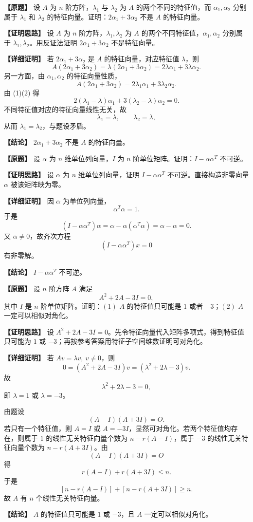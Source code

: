 \documentclass[11pt,a4paper,UTF8]{ctexart}
\begin{document}
\begin{answerbox}
\textbf{【原题】} 设 $A$ 为 $n$ 阶方阵，$\lambda_1$ 与 $\lambda_2$ 为 $A$ 的两个不同的特征值，而 $\alpha_1,\alpha_2$ 分别属于 $\lambda_1$ 和 $\lambda_2$ 的特征向量。证明：$2\alpha_1+3\alpha_2$ 不是 $A$ 的特征向量。

\textbf{【证明思路】} 设 $A$ 为 $n$ 阶方阵，$\lambda_1,\lambda_2$ 为 $A$ 的两个不同特征值，$\alpha_1,\alpha_2$ 分别属于 $\lambda_1,\lambda_2$。用反证法证明 $2\alpha_1+3\alpha_2$ 不是特征向量。

\textbf{【详细证明】} 若 $2\alpha_1+3\alpha_2$ 是 $A$ 的特征向量，对应特征值 $\lambda$，则
\[
A(2\alpha_1+3\alpha_2)=\lambda(2\alpha_1+3\alpha_2)
=2\lambda\alpha_1+3\lambda\alpha_2. \tag{1}
\]
另一方面，由 $\alpha_1,\alpha_2$ 的特征向量性质，
\[
A(2\alpha_1+3\alpha_2)=2\lambda_1\alpha_1+3\lambda_2\alpha_2. \tag{2}
\]
由 (1)(2) 得
\[
2(\lambda_1-\lambda)\alpha_1+3(\lambda_2-\lambda)\alpha_2=0.
\]
不同特征值对应的特征向量线性无关，故
\[
\lambda_1=\lambda,\qquad \lambda_2=\lambda,
\]
从而 $\lambda_1=\lambda_2$，与题设矛盾。

\textbf{【结论】} $2\alpha_1+3\alpha_2$ 不是 $A$ 的特征向量。
\end{answerbox}

\begin{answerbox}
\textbf{【原题】} 设 $\alpha$ 为 $n$ 维单位列向量，$I$ 为 $n$ 阶单位矩阵。证明：$I-\alpha\alpha^T$ 不可逆。

\textbf{【证明思路】} 设 $\alpha$ 为 $n$ 维单位列向量，证明 $I-\alpha\alpha^T$ 不可逆。直接构造非零向量 $\alpha$ 被该矩阵映为零。

\textbf{【详细证明】} 因 $\alpha$ 为单位列向量，
\[
\alpha^T\alpha=1.
\]
于是
\[
(I-\alpha\alpha^T)\alpha
=\alpha-\alpha(\alpha^T\alpha)
=\alpha-\alpha=0.
\]
又 $\alpha\ne0$，故齐次方程
\[
(I-\alpha\alpha^T)x=0
\]
有非零解。

\textbf{【结论】} $I-\alpha\alpha^T$ 不可逆。
\end{answerbox}

\begin{answerbox}
\textbf{【原题】} 设 $n$ 阶方阵 $A$ 满足
\[
A^2+2A-3I=0,
\]
其中 $I$ 是 $n$ 阶单位矩阵。证明：$(1)$ $A$ 的特征值只可能是 $1$ 或者 $-3$；$(2)$ $A$ 一定可以相似对角化。

\textbf{【证明思路】} 设 $A^2+2A-3I=0$。先令特征向量代入矩阵多项式，得到特征值只可能为 $1$ 或 $-3$；再按参考答案用特征子空间维数证明可对角化。

\textbf{【详细证明】} 若 $Av=\lambda v,\ v\ne0$，则
\[
0=(A^2+2A-3I)v=(\lambda^2+2\lambda-3)v.
\]
故
\[
\lambda^2+2\lambda-3=0,
\]
即 $\lambda=1$ 或 $\lambda=-3$。

由题设
\[
(A-I)(A+3I)=O.
\]
若只有一个特征值，则 $A=I$ 或 $A=-3I$，显然可对角化。若两个特征值均存在，则属于 $1$ 的线性无关特征向量个数为 $n-r(A-I)$，属于 $-3$ 的线性无关特征向量个数为 $n-r(A+3I)$。由
\[
(A-I)(A+3I)=O
\]
得
\[
r(A-I)+r(A+3I)\le n.
\]
于是
\[
[n-r(A-I)]+[n-r(A+3I)]\ge n.
\]
故 $A$ 有 $n$ 个线性无关特征向量。

\textbf{【结论】} $A$ 的特征值只可能是 $1$ 或 $-3$，且 $A$ 一定可以相似对角化。
\end{answerbox}
\end{document}

